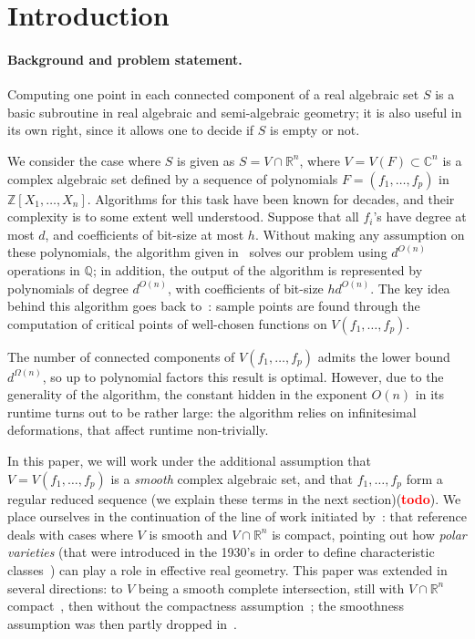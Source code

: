 \documentclass[12pt]{article}
\newcommand{\ZZ}{{\mathbb{Z}}}
\def\C{\mathbb{C}}
\def\Q{\mathbb{Q}}
\def\R{\mathbb{R}}
\def\td{(\textcolor{red}{{\bf todo}})}
\begin{document}
\section{Introduction}

\paragraph*{Background and problem statement.}
Computing one point in each connected component of a real algebraic
set $S$ is a basic subroutine in real algebraic and semi-algebraic
geometry; it is also useful in its own right, since it allows one to
decide if $S$ is empty or not. 

We consider the case where $S$ is given as $S=V \cap \R^n$, where
$V=V(F) \subset \C^n$ is a complex algebraic set defined by a sequence
of polynomials $F = (f_1,\hdots,f_p)$ in
$\ZZ[X_1,\dots,X_n]$. Algorithms for this task have been known for
decades, and their complexity is to some extent well
understood. Suppose that all $f_i$'s have degree at most $d$, and
coefficients of bit-size at most $h$. Without making any assumption on
these polynomials, the algorithm given
in~\cite[Section~13.1]{BaPoRo03} solves our problem using $d^{O(n)}$
operations in $\Q$; in addition, the output of the algorithm is
represented by polynomials of degree $d^{O(n)}$, with coefficients of
bit-size $hd^{O(n)}$. The key idea behind this algorithm goes back
to~\cite{GrVo88}: sample points are found through the computation of
critical points of well-chosen functions on $V(f_1,\dots,f_p)$.

The number of connected components of $V(f_1,\dots,f_p)$ admits the
lower bound $d^{\Omega(n)}$, so up to polynomial factors this result
is optimal. However, due to the generality of the algorithm, the
constant hidden in the exponent $O(n)$ in its runtime turns out to be
rather large: the algorithm relies on infinitesimal deformations, that
affect runtime non-trivially.

In this paper, we will work under the additional assumption that
$V=V(f_1,\dots,f_p)$ is a {\em smooth} complex algebraic set, and that
$f_1,\dots,f_p$ form a regular reduced sequence (we explain these
terms in the next section)\td.  We place ourselves in the continuation of
the line of work initiated by~\cite{BaGiHeMb97}: that reference deals
with cases where $V$ is smooth and $V \cap \R^n$ is compact, pointing
out how {\em polar varieties} (that were introduced in the 1930's in
order to define characteristic classes~\cite{Piene78,Teissier88}) can
play a role in effective real geometry. This paper was extended in
several directions: to $V$ being a smooth complete intersection, still
with $V\cap \R^n$ compact~\cite{BaGiHeMb01}, then without the
compactness assumption~\cite{EMP,BaGiHePa05}; the smoothness
assumption was then partly dropped in~\cite{BaGiHe14,BaGiHeLePa12}.
\end{document}
